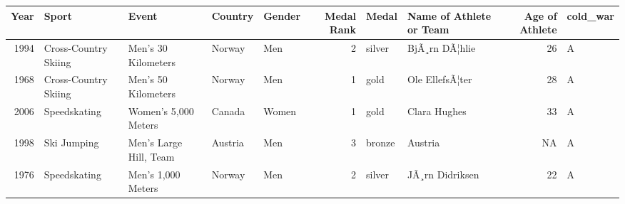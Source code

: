 \documentclass[]{book}
\theoremstyle{definition}
\theoremstyle{definition}
\theoremstyle{definition}
\theoremstyle{remark}
\begin{document}
\begin{tabular}{r|l|l|l|l|r|l|l|r|l}
\hline
Year & Sport & Event & Country & Gender & Medal Rank & Medal & Name of Athlete or Team & Age of Athlete & cold\_war\\
\hline
1994 & Cross-Country Skiing & Men's 30 Kilometers & Norway & Men & 2 & silver & BjÃ¸rn DÃ¦hlie & 26 & A\\
\hline
1968 & Cross-Country Skiing & Men's 50 Kilometers & Norway & Men & 1 & gold & Ole EllefsÃ¦ter & 28 & A\\
\hline
2006 & Speedskating & Women's 5,000 Meters & Canada & Women & 1 & gold & Clara Hughes & 33 & A\\
\hline
1998 & Ski Jumping & Men's Large Hill, Team & Austria & Men & 3 & bronze & Austria & NA & A\\
\hline
1976 & Speedskating & Men's 1,000 Meters & Norway & Men & 2 & silver & JÃ¸rn Didriksen & 22 & A\\
\hline
\end{tabular}
\end{document}
